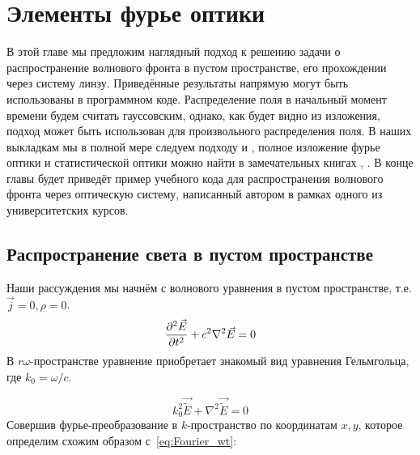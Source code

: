 \iffalse
\chapter{Элементы фурье оптики}
В этой главе мы предложим наглядный подход к решению задачи о распространение волнового фронта в пустом пространстве, его прохождении через систему линзу. Приведённые результаты напрямую могут быть использованы в программном коде. Распределение поля в начальный момент времени будем считать гауссовским, однако, как будет видно из изложения, подход может быть использован для произвольного распределения поля. В наших выкладкам мы в полной мере следуем подходу \cite{serkez2013grating} и \cite{serkez2015design}, полное изложение фурье оптики и статистической оптики можно найти в замечательных книгах \cite{goodman2015statistical}, \cite{goodman2005introduction}. В конце главы будет приведёт пример учебного кода \cite{my_github} для распространения волнового фронта через оптическую систему, написанный автором в рамках одного из университетских курсов.

\section{Распространение света в пустом пространстве}
Наши рассуждения мы начнём с волнового уравнения в пустом пространстве, т.е. $\vec{j} = 0, \rho = 0$. 
\begin{equation}
\pdv[2]{\vec{E}}{t} + c^2 \nabla^2 \vec{E} = 0
\end{equation}
В  $r\omega$-пространстве уравнение приобретает знакомый вид уравнения Гельмгольца, где $k_0 = \omega/c$.

\begin{equation}
k_0^2\vec{\widetilde{E}} + \nabla^2 \vec{\widetilde{E}} = 0
\end{equation}
Совершив фурье-преобразование в $k$-пространство по координатам $x,y$, которое определим схожим образом с~\ref{eq:Fourier_wt}:

